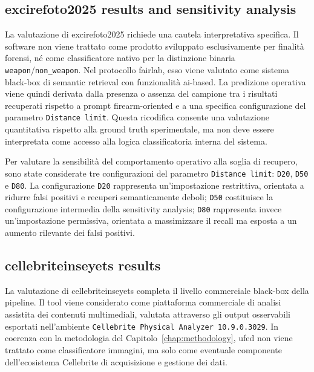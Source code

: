 
\subsection{\gls{excirefoto2025} results and sensitivity analysis}
\label{subsec:results-excire}

La valutazione di \gls{excirefoto2025} richiede una cautela interpretativa
specifica. Il software non viene trattato come prodotto sviluppato esclusivamente
per finalità forensi, né come classificatore nativo per la distinzione binaria
\texttt{weapon}/\texttt{non\_weapon}. Nel protocollo \gls{fairlab}, esso viene
valutato come sistema black-box di semantic retrieval con funzionalità
\gls{ai}-based. La predizione operativa viene quindi derivata dalla presenza o
assenza del campione tra i risultati recuperati rispetto a prompt firearm-oriented
e a una specifica configurazione del parametro \texttt{Distance limit}. Questa
ricodifica consente una valutazione quantitativa rispetto alla ground truth
sperimentale, ma non deve essere interpretata come accesso alla logica
classificatoria interna del sistema.

Per valutare la sensibilità del comportamento operativo alla soglia di recupero,
sono state considerate tre configurazioni del parametro \texttt{Distance limit}:
\texttt{D20}, \texttt{D50} e \texttt{D80}. La configurazione \texttt{D20}
rappresenta un'impostazione restrittiva, orientata a ridurre falsi positivi e
recuperi semanticamente deboli; \texttt{D50} costituisce la configurazione
intermedia della sensitivity analysis; \texttt{D80} rappresenta invece
un'impostazione permissiva, orientata a massimizzare il recall ma esposta a un
aumento rilevante dei falsi positivi.


\subsection{\gls{cellebriteinseyets} results}
\label{subsec:results-cellebrite}

La valutazione di \gls{cellebriteinseyets} completa il livello commerciale
black-box della pipeline. Il tool viene considerato come piattaforma commerciale
di analisi assistita dei contenuti multimediali, valutata attraverso gli output
osservabili esportati nell'ambiente \texttt{Cellebrite Physical Analyzer
10.9.0.3029}. In coerenza con la metodologia del Capitolo~\ref{chap:methodology},
\gls{ufed} non viene trattato come classificatore immagini, ma solo come eventuale
componente dell'ecosistema Cellebrite di acquisizione e gestione dei dati.

